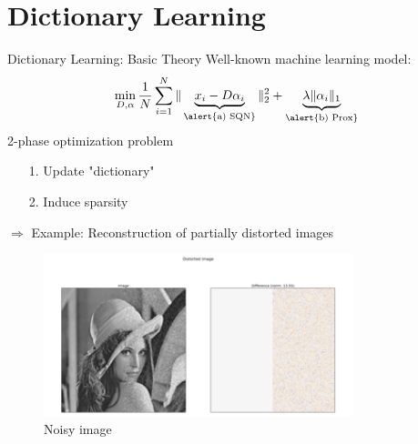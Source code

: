 \documentclass[10pt]{beamer}
\begin{document}
\section{Dictionary Learning}
\begin{frame}{Dictionary Learning: Basic Theory}
	\center Well-known machine learning model:
	\begin{equation*}
	\min_{D, \alpha} \frac{1}{N} \sum_{i=1}^N \|\underbrace{ x_i - D \alpha_i }_{\text{\alert{a) SQN}}}\|_2^2 + \underbrace{\lambda \| 
		\alpha_i \|_1}_{\text{\alert{b) Prox}}}
	\end{equation*}
	\center \alert{ 2-phase optimization problem}
	\begin{itemize}
		\item[1.] Update "dictionary" 
		\item[2.] Induce sparsity
	\end{itemize}
	$\Rightarrow$ Example: Reconstruction of partially distorted images
\end{frame}

\begin{frame}
	\begin{figure}[h!]
		\centering
		\includegraphics[width=0.8\textwidth]{lena_noisy.png}
		\caption{Noisy image}
	\end{figure}
\end{frame}
\end{document}
